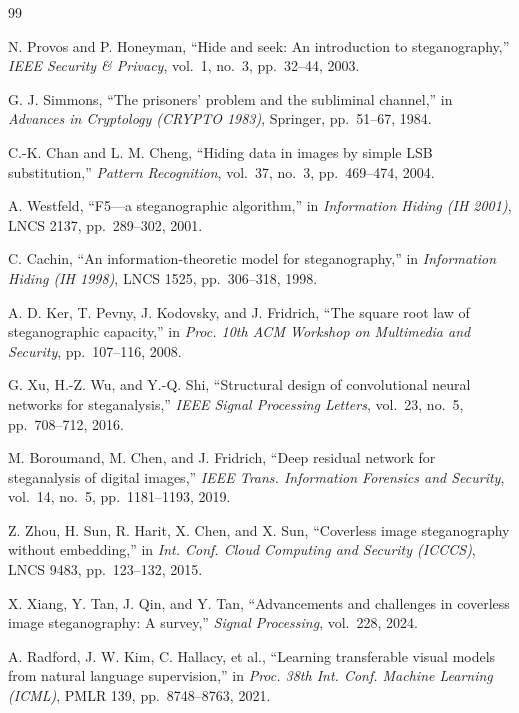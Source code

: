 \documentclass[10pt,a4paper]{article}
\theoremstyle{definition}
\begin{document}
\begingroup
\fontsize{12}{14.4}\selectfont
\begin{thebibliography}{99}

N. Provos and P. Honeyman,
``Hide and seek: An introduction to steganography,''
\emph{IEEE Security \& Privacy}, vol.~1, no.~3, pp.~32--44, 2003.

G. J. Simmons,
``The prisoners' problem and the subliminal channel,''
in \emph{Advances in Cryptology (CRYPTO 1983)}, Springer, pp.~51--67, 1984.

C.-K. Chan and L. M. Cheng,
``Hiding data in images by simple LSB substitution,''
\emph{Pattern Recognition}, vol.~37, no.~3, pp.~469--474, 2004.

A. Westfeld,
``F5---a steganographic algorithm,''
in \emph{Information Hiding (IH 2001)}, LNCS 2137, pp.~289--302, 2001.

C. Cachin,
``An information-theoretic model for steganography,''
in \emph{Information Hiding (IH 1998)}, LNCS 1525, pp.~306--318, 1998.

A. D. Ker, T. Pevny, J. Kodovsky, and J. Fridrich,
``The square root law of steganographic capacity,''
in \emph{Proc. 10th ACM Workshop on Multimedia and Security}, pp.~107--116, 2008.

G. Xu, H.-Z. Wu, and Y.-Q. Shi,
``Structural design of convolutional neural networks for steganalysis,''
\emph{IEEE Signal Processing Letters}, vol.~23, no.~5, pp.~708--712, 2016.

M. Boroumand, M. Chen, and J. Fridrich,
``Deep residual network for steganalysis of digital images,''
\emph{IEEE Trans. Information Forensics and Security}, vol.~14, no.~5, pp.~1181--1193, 2019.

Z. Zhou, H. Sun, R. Harit, X. Chen, and X. Sun,
``Coverless image steganography without embedding,''
in \emph{Int. Conf. Cloud Computing and Security (ICCCS)}, LNCS 9483, pp.~123--132, 2015.

X. Xiang, Y. Tan, J. Qin, and Y. Tan,
``Advancements and challenges in coverless image steganography: A survey,''
\emph{Signal Processing}, vol.~228, 2024.

A. Radford, J. W. Kim, C. Hallacy, et al.,
``Learning transferable visual models from natural language supervision,''
in \emph{Proc. 38th Int. Conf. Machine Learning (ICML)}, PMLR 139, pp.~8748--8763, 2021.


\end{thebibliography}
\end{document}
